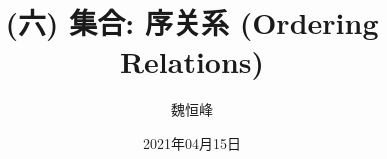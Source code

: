 \documentclass[]{beamer}
\title[(六) 序关系 (Ordering Relations)]{(六) 集合: 序关系 (Ordering Relations)}
\author[魏恒峰]{\large 魏恒峰}
\institute{hfwei@nju.edu.cn}
\date{2021年04月15日}
\begin{document}
\maketitle


% 
% 
% 

\thankyou{}

\end{document}
